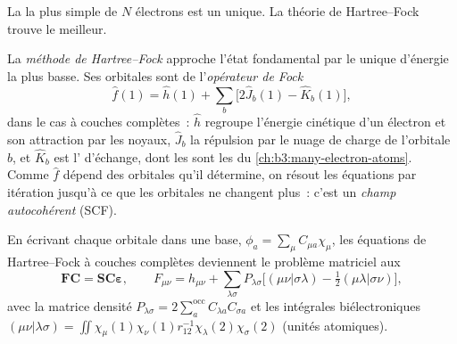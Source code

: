 La  la plus simple de $N$ électrons est un
 unique. La théorie de Hartree--Fock trouve le
meilleur.

\begin{definition}\label{def:b3:computational-chemistry:hartree-fock}
La \emph{méthode de Hartree--Fock} approche
l'état fondamental par le  unique d'énergie la plus
basse. Ses orbitales sont  de l'\emph{opérateur de Fock}
\[
\hat f(1) = \hat h(1) + \sum_b\big[2\hat J_b(1) - \hat K_b(1)\big],
\]
dans le cas à couches complètes~: $\hat h$ regroupe l'énergie cinétique
d'un électron et son attraction par les noyaux, $\hat J_b$ la répulsion
par le nuage de charge de l'orbitale $b$, et $\hat K_b$ est l'
d'échange, dont les  sont les  du
\cref{ch:b3:many-electron-atoms}. Comme $\hat f$ dépend des orbitales
qu'il détermine, on résout les équations par itération jusqu'à ce que
les orbitales ne changent plus~: c'est un \emph{champ
autocohérent} (SCF).
\end{definition}

\begin{theorem}\label{thm:b3:computational-chemistry:roothaan}
En écrivant chaque orbitale dans une base, $\phi_a = \sum_\mu C_{\mu a}\chi_\mu$, les
équations de Hartree--Fock à couches complètes deviennent le problème
matriciel aux 
\[
\mathbf F\mathbf C = \mathbf S\mathbf C\boldsymbol\varepsilon, \qquad F_{\mu\nu} =
h_{\mu\nu} + \sum_{\lambda\sigma}P_{\lambda\sigma}\big[(\mu\nu|\sigma\lambda) -
\tfrac12(\mu\lambda|\sigma\nu)\big],
\]
avec la matrice densité $P_{\lambda\sigma} = 2\sum_a^{\mathrm{occ}}C_{\lambda a}C_{\sigma
a}$ et les intégrales biélectroniques $(\mu\nu|\lambda\sigma) = \iint\chi_\mu(1)\chi_\nu(1)
r_{12}^{-1}\chi_\lambda(2)\chi_\sigma(2)$ (unités atomiques).
\end{theorem}

